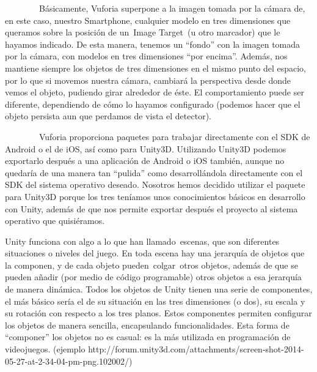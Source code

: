 \documentclass[]{article}
\begin{document}
~~~~~~~~Básicamente, Vuforia superpone a la imagen tomada por la cámara
de, en este caso, nuestro Smartphone, cualquier modelo en tres
dimensiones que queramos sobre la posición de un~Image Target~(u otro
marcador) que le hayamos indicado. De esta manera, tenemos un ``fondo''
con la imagen tomada por la cámara, con modelos en tres dimensiones
``por encima''. Además, nos mantiene siempre los objetos de tres
dimensiones en el mismo punto del espacio, por lo que si movemos nuestra
cámara, cambiará la perspectiva desde donde vemos el objeto, pudiendo
girar alrededor de éste. El comportamiento puede ser diferente,
dependiendo de cómo lo hayamos configurado (podemos hacer que el objeto
persista aun que perdamos de vista el detector).


~~~~~~~~Vuforia proporciona paquetes para trabajar directamente con el
SDK de Android o el de iOS, así como para Unity3D. Utilizando Unity3D
podemos exportarlo después a una aplicación de Android o iOS también,
aunque no quedaría de una manera tan ``pulida'' como desarrollándola
directamente con el SDK del sistema operativo deseado. Nosotros hemos
decidido utilizar el paquete para Unity3D porque los tres teníamos unos
conocimientos básicos en desarrollo con Unity, además de que nos permite
exportar después el proyecto al sistema operativo que quisiéramos.


Unity funciona con algo a lo que han llamado~escenas, que son diferentes
situaciones o niveles del juego. En toda escena hay una jerarquía de
objetos que la componen, y de cada objeto pueden~colgar~otros objetos,
además de que se pueden añadir (por medio de código programable) otros
objetos a esa jerarquía de manera dinámica. Todos los objetos de Unity
tienen una serie de componentes, el más básico sería el de su situación
en las tres dimensiones (o dos), su escala y su rotación con respecto a
los tres planos. Estos componentes permiten configurar los objetos de
manera sencilla, encapsulando funcionalidades. Esta forma de
``componer'' los objetos no es casual: es la más utilizada en
programación de videojuegos. (ejemplo
http://forum.unity3d.com/attachments/screen-shot-2014-05-27-at-2-34-04-pm-png.102002/)
\end{document}

